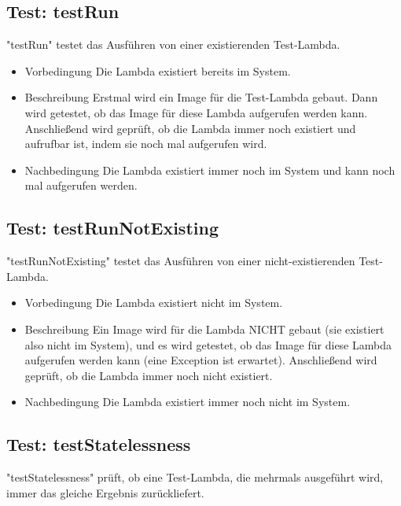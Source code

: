 \documentclass[a4paper,20pt,oneside]{book}
\begin{document}
\subsection{Test: testRun}			
	"testRun" testet das Ausführen von einer existierenden Test-Lambda.

\begin{itemize}
\item Vorbedingung\linebreak
Die Lambda existiert bereits im System.
\item Beschreibung\linebreak
Erstmal wird ein Image für die Test-Lambda gebaut. Dann wird getestet, ob das Image für diese Lambda aufgerufen werden kann. Anschließend wird geprüft, ob die Lambda immer noch existiert und aufrufbar ist, indem sie noch mal aufgerufen wird.
\item Nachbedingung\linebreak
Die Lambda existiert immer noch im System und kann noch mal aufgerufen werden.
\end{itemize}
\subsection{Test: testRunNotExisting}			
	"testRunNotExisting" testet das Ausführen von einer nicht-existierenden Test-Lambda.

\begin{itemize}
\item Vorbedingung\linebreak
Die Lambda existiert nicht im System.
\item Beschreibung\linebreak
Ein Image wird für die Lambda NICHT gebaut (sie existiert also nicht im System), und es wird getestet, ob das Image für diese Lambda aufgerufen werden kann (eine Exception ist erwartet). Anschließend wird geprüft, ob die Lambda immer noch nicht existiert.
\item Nachbedingung\linebreak
Die Lambda existiert immer noch nicht im System.
\end{itemize}

\subsection{Test: testStatelessness}			
	"testStatelessness" prüft, ob eine Test-Lambda, die mehrmals ausgeführt wird, immer das gleiche Ergebnis zurückliefert.
\end{document}
